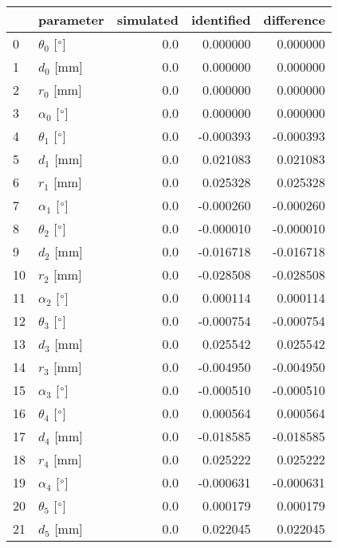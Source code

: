 \documentclass{standalone}%
\begin{document}
%
\normalsize%
\begin{tabular}{llrrr}
\toprule
{} &                 parameter & simulated & identified & difference \\
\midrule
0  &  $\theta_{0}$ [$\degree$] &       0.0 &   0.000000 &   0.000000 \\
1  &              $d_{0}$ [mm] &       0.0 &   0.000000 &   0.000000 \\
2  &              $r_{0}$ [mm] &       0.0 &   0.000000 &   0.000000 \\
3  &  $\alpha_{0}$ [$\degree$] &       0.0 &   0.000000 &   0.000000 \\
4  &  $\theta_{1}$ [$\degree$] &       0.0 &  -0.000393 &  -0.000393 \\
5  &              $d_{1}$ [mm] &       0.0 &   0.021083 &   0.021083 \\
6  &              $r_{1}$ [mm] &       0.0 &   0.025328 &   0.025328 \\
7  &  $\alpha_{1}$ [$\degree$] &       0.0 &  -0.000260 &  -0.000260 \\
8  &  $\theta_{2}$ [$\degree$] &       0.0 &  -0.000010 &  -0.000010 \\
9  &              $d_{2}$ [mm] &       0.0 &  -0.016718 &  -0.016718 \\
10 &              $r_{2}$ [mm] &       0.0 &  -0.028508 &  -0.028508 \\
11 &  $\alpha_{2}$ [$\degree$] &       0.0 &   0.000114 &   0.000114 \\
12 &  $\theta_{3}$ [$\degree$] &       0.0 &  -0.000754 &  -0.000754 \\
13 &              $d_{3}$ [mm] &       0.0 &   0.025542 &   0.025542 \\
14 &              $r_{3}$ [mm] &       0.0 &  -0.004950 &  -0.004950 \\
15 &  $\alpha_{3}$ [$\degree$] &       0.0 &  -0.000510 &  -0.000510 \\
16 &  $\theta_{4}$ [$\degree$] &       0.0 &   0.000564 &   0.000564 \\
17 &              $d_{4}$ [mm] &       0.0 &  -0.018585 &  -0.018585 \\
18 &              $r_{4}$ [mm] &       0.0 &   0.025222 &   0.025222 \\
19 &  $\alpha_{4}$ [$\degree$] &       0.0 &  -0.000631 &  -0.000631 \\
20 &  $\theta_{5}$ [$\degree$] &       0.0 &   0.000179 &   0.000179 \\
21 &              $d_{5}$ [mm] &       0.0 &   0.022045 &   0.022045 \\

\end{tabular}
\end{document}
